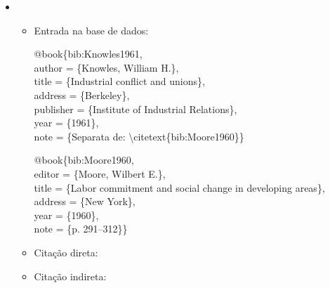 \documentclass[a4paper,12pt,oneside,onecolumn]{uerj/uerj}
\newcommand{\formato}[1]{\begin{flushleft}{#1}\end{flushleft}}
\begin{document}
\begin{itemize}[label={Ex.:},leftmargin=\parindent,parsep=0pt,itemsep=0pt]
  \item \formato{\citetext{bib:Knowles1961}}


  \begin{itemize}[leftmargin=*,parsep=0pt,itemsep=0pt]
    \item Entrada na base de dados:

    \formato{
      @book\{bib:Knowles1961,\\
        author = \{Knowles, William H.\},\\
        title = \{Industrial conflict and unions\},\\
        address = \{Berkeley\},\\
        publisher = \{Institute of Industrial Relations\},\\
        year = \{1961\},\\
        note = \{Separata de: \textbackslash citetext\{bib:Moore1960\}\}\\
    }

    \formato{
      @book\{bib:Moore1960,\\
        editor = \{Moore, Wilbert E.\},\\
        title = \{Labor commitment and social change in developing areas\},\\
        address = \{New York\},\\
        year = \{1960\},\\
        note = \{{p}. 291--312\}\}\\
    }

    \item Citação direta: 
    \item Citação indireta: \cite{bib:Knowles1961}\\
  \end{itemize}
\end{itemize}
\end{document}
